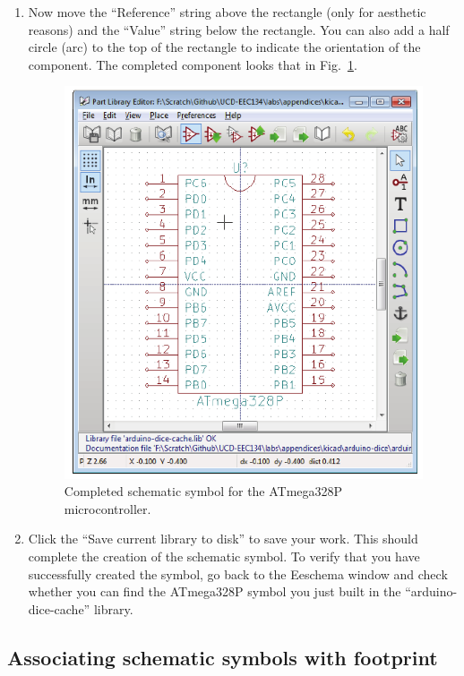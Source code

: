 \documentclass[12pt,letterpaper]{scrartcl}
\begin{document}
\begin{enumerate}
	\item Now move the ``Reference'' string above the rectangle (only for aesthetic reasons) and the ``Value'' string below the rectangle. You can also add a half circle (arc) to the top of the rectangle to indicate the orientation of the component. The completed component looks that in Fig.~\ref{fig:atmega328p-symbol-final}. 
		\begin{figure}[hp]
			\centering
			\includegraphics{atmega328p-symbol-final.pdf}
			\caption{Completed schematic symbol for the ATmega328P microcontroller.}
			\label{fig:atmega328p-symbol-final}
		\end{figure}
		
	\item Click the “Save current library to disk” to save your work. This should complete the creation of the schematic symbol. To verify that you have successfully created the symbol, go back to the Eeschema window and check whether you can find the ATmega328P symbol you just built in the ``arduino-dice-cache'' library. 
	
\end{enumerate}

\newpage
\subsection{Associating schematic symbols with footprint}
\label{sec:cvpcb}
\end{document}
